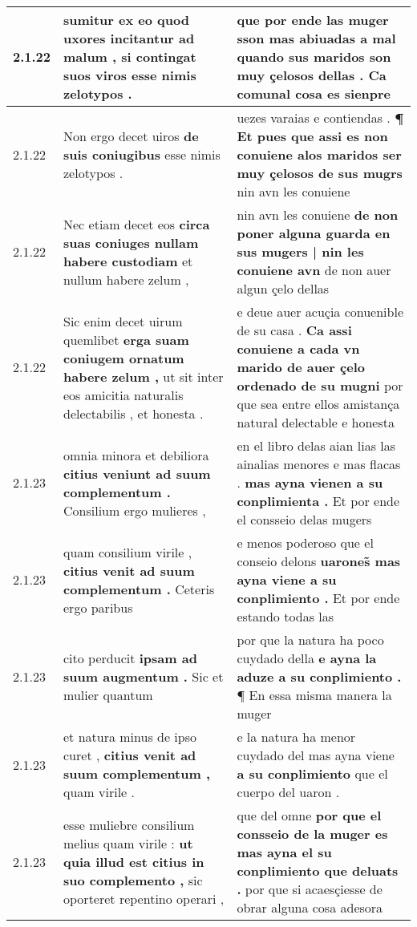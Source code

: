 \begin{tabular}{|p{1cm}|p{6.5cm}|p{6.5cm}|}
2.1.22 & sumitur ex eo quod uxores incitantur ad malum , \textbf{ si contingat suos viros } esse nimis zelotypos . & que por ende las muger sson mas abiuadas a mal \textbf{ quando sus maridos son muy çelosos dellas . } Ca comunal cosa es sienpre \\\hline
2.1.22 & Non ergo decet uiros \textbf{ de suis coniugibus } esse nimis zelotypos . & uezes varaias e contiendas . \textbf{ ¶ Et pues que assi es non conuiene alos maridos ser muy çelosos de sus mugrs } nin avn les conuiene \\\hline
2.1.22 & Nec etiam decet eos \textbf{ circa suas coniuges nullam habere custodiam } et nullum habere zelum , & nin avn les conuiene \textbf{ de non poner alguna guarda en sus mugers | nin les conuiene avn } de non auer algun çelo dellas \\\hline
2.1.22 & Sic enim decet uirum quemlibet \textbf{ erga suam coniugem ornatum habere zelum , } ut sit inter eos amicitia naturalis delectabilis , et honesta . & e deue auer acuçia conuenible de su casa . \textbf{ Ca assi conuiene a cada vn marido de auer çelo ordenado de su mugni } por que sea entre ellos amistança natural delectable e honesta \\\hline
2.1.23 & omnia minora et debiliora \textbf{ citius veniunt ad suum complementum . } Consilium ergo mulieres , & en el libro delas aian lias las ainalias menores e mas flacas . \textbf{ mas ayna vienen a su conplimienta . } Et por ende el consseio delas mugers \\\hline
2.1.23 & quam consilium virile , \textbf{ citius venit ad suum complementum . } Ceteris ergo paribus & e menos poderoso que el conseio delons \textbf{ uarones̃ mas ayna viene a su conplimiento . } Et por ende estando todas las \\\hline
2.1.23 & cito perducit \textbf{ ipsam ad suum augmentum . } Sic et mulier quantum & por que la natura ha poco cuydado della \textbf{ e ayna la aduze a su conplimiento . } ¶ En essa misma manera la muger \\\hline
2.1.23 & et natura minus de ipso curet , \textbf{ citius venit ad suum complementum , } quam virile . & e la natura ha menor cuydado del mas ayna viene \textbf{ a su conplimiento } que el cuerpo del uaron . \\\hline
2.1.23 & esse muliebre consilium melius quam virile : \textbf{ ut quia illud est citius in suo complemento , } sic oporteret repentino operari , & que del omne \textbf{ por que el consseio de la muger es mas ayna el su conplimiento que deluats . } por que si acaesçiesse de obrar alguna cosa adesora \\\hline

\end{tabular}
